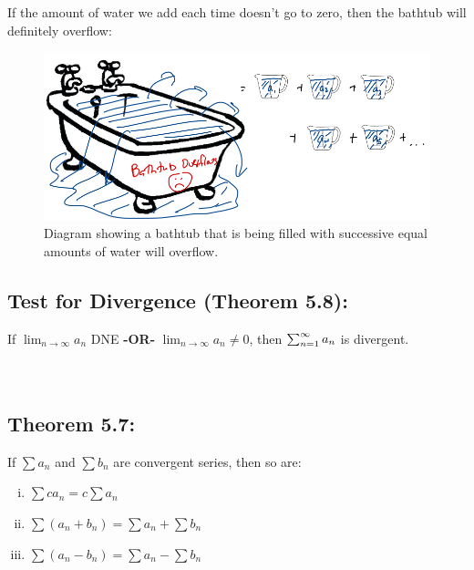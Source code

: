 
If the amount of water we add each time doesn't go to zero, then the bathtub will definitely overflow:\\

\begin{figure}[!h]
\includegraphics[width=.9\columnwidth]{Ch8s2-bath-div.png}
\caption{Diagram showing a bathtub that is being filled with successive equal amounts of water will overflow.}
\end{figure}

\subsection*{Test for Divergence (Theorem 5.8):}
If \(\lim_{n\rightarrow\infty} a_n\) DNE \textbf{-OR-} \(\lim_{n\rightarrow\infty} a_n \neq 0\), then \(\sum_{n=1}^\infty a_n\) is  divergent.\\~\\~\\


\vspace*{.1in}


\subsection*{Theorem 5.7: }

%
If \(\sum a_n\) and \(\sum b_n\) are convergent series, then so are:
\begin{enumerate}[(i)]
\item \(\sum c a_n = c\sum a_n\)
\item \(\sum (a_n+ b_n) = \sum	a_n + \sum	b_n\)
\item \(\sum (a_n- b_n) = \sum	a_n - \sum	b_n\)
\end{enumerate}

